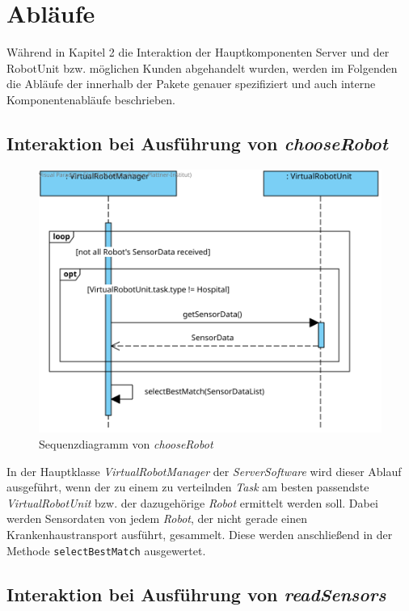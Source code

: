 \section{Abläufe}

Während in Kapitel 2 die Interaktion der Hauptkomponenten Server und der RobotUnit bzw. möglichen Kunden abgehandelt wurden, werden im Folgenden die Abläufe der innerhalb der Pakete genauer spezifiziert und auch interne Komponentenabläufe beschrieben.

\subsection*{Interaktion bei Ausführung von \textit{chooseRobot}}


\begin{figure}[H]
	\centering
	\includegraphics[width=1\textwidth]{img/8-chooseRobot}
	\caption{Sequenzdiagramm von \emph{chooseRobot}}
	\label{chooseRobotInteraktion}
\end{figure}
In der Hauptklasse \textit{VirtualRobotManager} der \textit{ServerSoftware} wird dieser Ablauf ausgeführt, wenn der zu einem zu verteilnden \textit{Task} am besten passendste \textit{VirtualRobotUnit} bzw. der dazugehörige \textit{Robot} ermittelt werden soll. Dabei werden Sensordaten von jedem \textit{Robot}, der nicht gerade einen Krankenhaustransport ausführt, gesammelt. Diese werden anschließend in der Methode \texttt{selectBestMatch} ausgewertet.
\\

\subsection*{Interaktion bei Ausführung von \textit{readSensors}}


